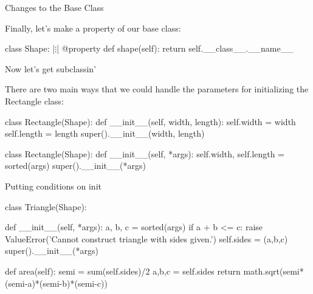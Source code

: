 \documentclass[aspectratio=169] {beamer}
\begin{document}
\begin{frame}[fragile]{Changes to the Base Class}

Finally, let's make  a property of our base class:


  \begin{pythoncode}
    class Shape:
            |$\vdots$|
        @property
        def shape(self):
            return self.__class__.__name__

  \end{pythoncode}



\end{frame}


\begin{frame}[fragile]{Now let's get subclassin'}

There are two main ways that we could handle the parameters for initializing the Rectangle class:
\begin{pythoncode}
class Rectangle(Shape):
    def __init__(self, width, length):
        self.width = width
        self.length = length
        super().__init__(width, length)
\end{pythoncode}

\begin{pythoncode}
class Rectangle(Shape):
    def __init__(self, *args):
        self.width, self.length = sorted(args)
        super().__init__(*args)
\end{pythoncode}

\end{frame}


\begin{frame}[fragile]{Putting conditions on init}

  \begin{pythoncode}
    class Triangle(Shape):
    
        def __init__(self, *args):
            a, b, c = sorted(args)
            if a + b <= c:
                raise ValueError('Cannot construct triangle with sides given.')
            self.sides = (a,b,c)
            super().__init__(*args)
    
        def area(self):
            semi = sum(self.sides)/2
            a,b,c = self.sides
            return math.sqrt(semi*(semi-a)*(semi-b)*(semi-c))
    
  \end{pythoncode}

\end{frame}
\end{document}
